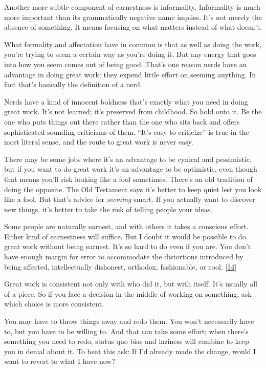 Another more subtle component of earnestness is informality. Informality
is much more important than its grammatically negative name implies.
It's not merely the absence of something. It means focusing on what
matters instead of what doesn't.

What formality and affectation have in common is that as well as doing
the work, you're trying to seem a certain way as you're doing it. But
any energy that goes into how you seem comes out of being good. That's
one reason nerds have an advantage in doing great work: they expend
little effort on seeming anything. In fact that's basically the
definition of a nerd.

Nerds have a kind of innocent boldness that's exactly what you need in
doing great work. It's not learned; it's preserved from childhood. So
hold onto it. Be the one who puts things out there rather than the one
who sits back and offers sophisticated-sounding criticisms of them.
``It's easy to criticize'' is true in the most literal sense, and the
route to great work is never easy.

There may be some jobs where it's an advantage to be cynical and
pessimistic, but if you want to do great work it's an advantage to be
optimistic, even though that means you'll risk looking like a fool
sometimes. There's an old tradition of doing the opposite. The Old
Testament says it's better to keep quiet lest you look like a fool. But
that's advice for \emph{seeming} smart. If you actually want to discover
new things, it's better to take the risk of telling people your ideas.

Some people are naturally earnest, and with others it takes a conscious
effort. Either kind of earnestness will suffice. But I doubt it would be
possible to do great work without being earnest. It's so hard to do even
if you are. You don't have enough margin for error to accommodate the
distortions introduced by being affected, intellectually dishonest,
orthodox, fashionable, or cool. {[}\hyperref[f14n]{14}{]}

Great work is consistent not only with who did it, but with itself. It's
usually all of a piece. So if you face a decision in the middle of
working on something, ask which choice is more consistent.

You may have to throw things away and redo them. You won't necessarily
have to, but you have to be willing to. And that can take some effort;
when there's something you need to redo, status quo bias and laziness
will combine to keep you in denial about it. To beat this ask: If I'd
already made the change, would I want to revert to what I have now?

